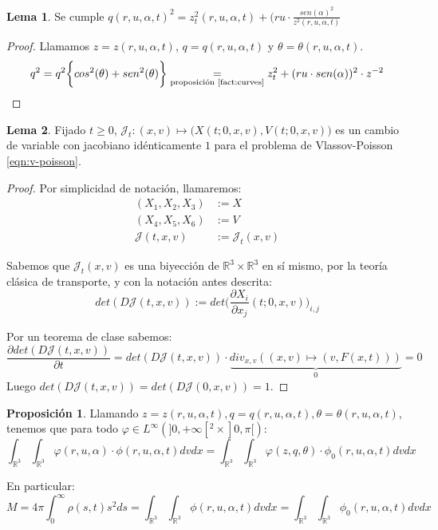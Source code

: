\documentclass[a4paper,10pt]{scrartcl}
\theoremstyle{definition}
\newtheorem{lemma}{Lema}
\newtheorem{fact}{Proposición}
\numberwithin{equation}{section}
\begin{document}
\begin{lemma}\label{lemma:qsquare}
 Se cumple $q(r,u,\alpha,t)^2 = z_t^2(r,u,\alpha,t) + (ru \cdot \frac{sen(\alpha)^2}{z^2(r,u,\alpha,t)}$
\end{lemma}
\begin{proof}
Llamamos $z = z(r,u,\alpha,t)$, $q = q(r,u,\alpha,t)$ y $\theta = \theta(r,u,\alpha,t)$.
 \[
    q^2 = q^2 \bigg\{cos^2(\theta) + sen^2(\theta)\bigg\} \underset{\textrm{proposición \ref{fact:curves}}}{=} z_t^2 + (ru\cdot sen(\alpha))^2 \cdot z^{-2}
 \]
\end{proof}


\begin{lemma}
Fijado $t\ge 0$, $\mathcal{J}_t:(x,v) \mapsto \bigg(X(t;0,x,v), V(t;0,x,v)\bigg)$ es un cambio de variable con jacobiano idénticamente $1$ para el problema de Vlassov-Poisson \eqref{eqn:v-poisson}.
\label{lemma:cv-vp}
\end{lemma}
\begin{proof}
Por simplicidad de notación, llamaremos:
\begin{align*}
(X_1, X_2, X_3) &:= X\\
(X_4, X_5, X_6) &:= V\\
\mathcal{J}(t,x,v) &:= \mathcal{J}_t(x,v)
\end{align*}

Sabemos que $\mathcal{J}_t(x,v)$ es una biyección de $\mathbb{R}^3 \times \mathbb{R}^3$ en sí mismo, por la teoría clásica de transporte, y con la notación antes descrita:
 \[
 det(D\mathcal{J}(t,x,v)) := det\bigg(\frac{\partial{X_i}}{\partial x_j}(t;0,x,v)\bigg)_{i,j}
 \]

 Por un teorema de clase sabemos:
 \[
 \frac{\partial det(D\mathcal{J}(t,x,v))}{\partial t} = det(D\mathcal{J}(t,x,v)) \cdot \underbrace{div_{x,v}((x,v) \mapsto (v,F(x,t)))}_0 = 0
 \]
 Luego $det(D\mathcal{J}(t,x,v)) = det(D\mathcal{J}(0,x,v)) = 1$.
\end{proof}

\begin{fact}
\label{eqn:varphi}
Llamando $z = z(r,u,\alpha,t), q = q(r,u,\alpha,t), \theta = \theta(r,u,\alpha,t)$, tenemos que para todo $\varphi \in L^{\infty}(]0,+\infty[^2 \times ]0,\pi[)$:
\[
    \int_{\mathbb{R}^3}\int_{\mathbb{R}^3} \varphi(r,u,\alpha) \cdot \phi(r,u,\alpha,t) dv dx = 
    \int_{\mathbb{R}^3}\int_{\mathbb{R}^3} \varphi(z,q,\theta) \cdot \phi_0(r,u,\alpha,t) dv dx
\]

En particular:
\[
M = 4\pi \int_0^{\infty} \rho(s,t) s^2 ds = \int_{\mathbb{R}^3} \int_{\mathbb{R}^3} \phi(r,u,\alpha,t) dv dx = \int_{\mathbb{R}^3}\int_{\mathbb{R}^3} \phi_0(r,u,\alpha,t) dv dx
\]
\end{fact}
\end{document}
